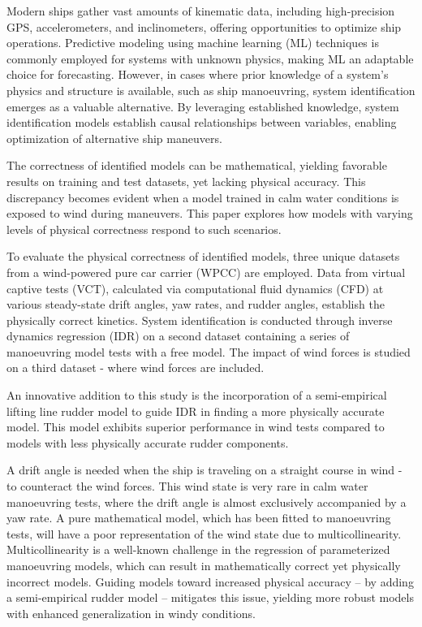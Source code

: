 Modern ships gather vast amounts of kinematic data, including high-precision GPS, accelerometers, and inclinometers, offering opportunities to optimize ship operations. Predictive modeling using machine learning (ML) techniques is commonly employed for systems with unknown physics, making ML an adaptable choice for forecasting. However, in cases where prior knowledge of a system's physics and structure is available, such as ship manoeuvring, system identification emerges as a valuable alternative. By leveraging established knowledge, system identification models establish causal relationships between variables, enabling optimization of alternative ship maneuvers.

The correctness of identified models can be mathematical, yielding favorable results on training and test datasets, yet lacking physical accuracy. This discrepancy becomes evident when a model trained in calm water conditions is exposed to wind during maneuvers. This paper explores how models with varying levels of physical correctness respond to such scenarios.

To evaluate the physical correctness of identified models, three unique datasets from a wind-powered pure car carrier (WPCC) are employed. Data from virtual captive tests (VCT), calculated via computational fluid dynamics (CFD) at various steady-state drift angles, yaw rates, and rudder angles, establish the physically correct kinetics. System identification is conducted through inverse dynamics regression (IDR) on a second dataset containing a series of manoeuvring model tests with a free model. The impact of wind forces is studied on a third dataset - where wind forces are included.

An innovative addition to this study is the incorporation of a semi-empirical lifting line rudder model to guide IDR in finding a more physically accurate model. This model exhibits superior performance in wind tests compared to models with less physically accurate rudder components.

A drift angle is needed when the ship is traveling on a straight course in wind - to counteract the wind forces. This wind state is very rare in calm water manoeuvring tests, where the drift angle is almost exclusively accompanied by a yaw rate. A pure mathematical model, which has been fitted to manoeuvring tests, will have a poor representation of the wind state due to multicollinearity. Multicollinearity is a well-known challenge in the regression of parameterized manoeuvring models, which can result in mathematically correct yet physically incorrect models. Guiding models toward increased physical accuracy -- by adding a semi-empirical rudder model -- mitigates this issue, yielding more robust models with enhanced generalization in windy conditions.
